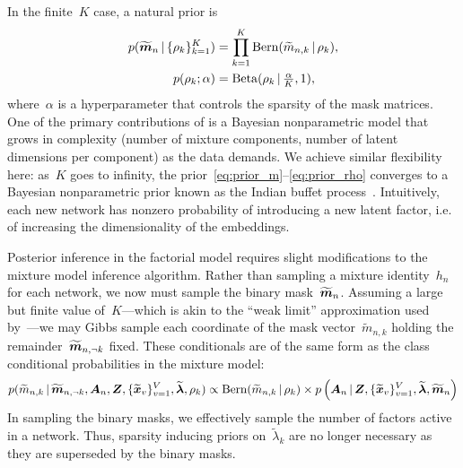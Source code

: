 In the finite~$K$ case, a natural prior is
\begin{align}
  \label{eq:prior_m}
  p(\widetilde{\boldsymbol{m}}_n \, | \, \{\rho_k\}_{k=1}^K)
  &=\prod_{k=1}^K \mathrm{Bern}(\widetilde{m}_{n,k} \, | \, \rho_k), \\
  \label{eq:prior_rho}
  p(\rho_k; \alpha) &= \mathrm{Beta}(\rho_k \, | \, \tfrac{\alpha}{K}, 1), 
\end{align}
where~$\alpha$ is a hyperparameter that controls the sparsity of the
mask matrices.  One of the primary contributions of
\citet{durante2016nonparametric} is a Bayesian nonparametric model
that grows in complexity (number of mixture components, number of
latent dimensions per component) as the data demands.
We achieve similar flexibility here: as~$K$ goes to infinity, the 
prior~\eqref{eq:prior_m}--\eqref{eq:prior_rho} converges to a Bayesian
nonparametric prior known as the Indian buffet process~\citep{griffiths2005infinite}.
Intuitively, each new network has nonzero probability of introducing a
new latent factor, i.e. of increasing the dimensionality of the
embeddings.

Posterior inference in the factorial model requires slight
modifications to the mixture model inference algorithm. Rather than
sampling a mixture identity~$h_n$ for each network, we now must sample
the binary mask~$\widetilde{\boldsymbol{m}}_n$. Assuming a large but finite
value of~$K$---which is akin to the ``weak limit'' approximation used
by~\citet{durante2016nonparametric}---we may Gibbs sample each
coordinate of the mask vector~$\widetilde{m}_{n,k}$ holding the
remainder~$\widetilde{\boldsymbol{m}}_{n,\neg k}$ fixed.  These conditionals are
of the same form as the class conditional probabilities in the mixture
model:
\begin{multline}
  p(\widetilde{m}_{n,k} \, | \, \widetilde{\boldsymbol{m}}_{n, \neg k}, \boldsymbol{A}_n, \boldsymbol{Z},
  \{\widetilde{\boldsymbol{x}}_v\}_{v=1}^V, \widetilde{\boldsymbol{\lambda}},\rho_k) 
  \propto \mathrm{Bern}(\widetilde{m}_{n,k} \, | \, \rho_k) \times
  p\left(\boldsymbol{A}_n \, | \,
  \boldsymbol{Z}, \{\widetilde{\boldsymbol{x}}_v\}_{v=1}^V,
  \widetilde{\boldsymbol{\lambda}}, \widetilde{\boldsymbol{m}}_n \right) 
\end{multline}
In sampling the binary masks, we effectively sample the number of
factors active in a network.  Thus, sparsity inducing priors
on~$\widetilde{\lambda}_k$ are no longer necessary as they are
superseded by the binary masks.

